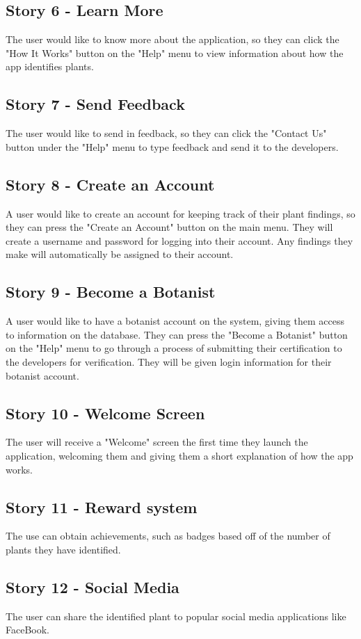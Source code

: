 \documentclass[a4paper]{article}
\begin{document}
\subsection{Story 6 - Learn More}
The user would like to know more about the application, so they can click the "How It Works" button on the "Help" menu to view information about how the app identifies plants.
\subsection{Story 7 - Send Feedback}
The user would like to send in feedback, so they can click the "Contact Us" button under the "Help" menu to type feedback and send it to the developers. 
\subsection{Story 8 - Create an Account}
A user would like to create an account for keeping track of their plant findings, so they can press the "Create an Account" button on the main menu. They will create a username and password for logging into their account. Any findings they make will automatically be assigned to their account.
\subsection{Story 9 - Become a Botanist}
A user would like to have a botanist account on the system, giving them access to information on the database. They can press the "Become a Botanist" button on the "Help" menu to go through a process of submitting their certification to the developers for verification. They will be given login information for their botanist account.
\subsection{Story 10 - Welcome Screen}
The user will receive a "Welcome" screen the first time they launch the application, welcoming them and giving them a short explanation of how the app works.
\subsection{Story 11 - Reward system}
The use can obtain achievements, such as badges based off of the number of plants they have identified. 
\subsection{Story 12 - Social Media}
The user can share the identified plant to popular social media applications like FaceBook.
\end{document}
